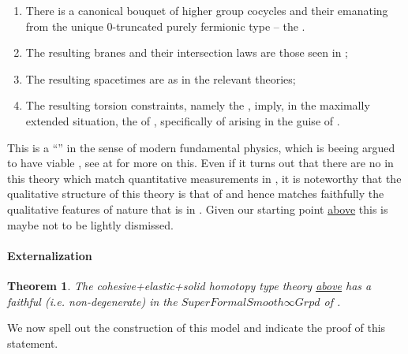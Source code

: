 \documentclass[12pt,titlepage]{article}
\theoremstyle{plain}
\newtheorem{theorem}{Theorem}
\theoremstyle{definition}
\theoremstyle{remark}
\begin{document}
\begin{enumerate}%
\item There is a canonical bouquet of higher group cocycles and their  emanating from the unique 0-truncated purely fermionic type -- the .


\item The resulting branes and their intersection laws are those seen in ;


\item The resulting spacetimes are  as in the relevant  theories;


\item The resulting torsion constraints, namely the , imply, in the maximally extended situation, the   of , specifically of  arising in the guise of .



\end{enumerate}
This is a ``'' in the sense of modern fundamental physics, which is beeing argued to have viable , see at \emph{} for more on this. Even if it turns out that there are no  in this theory which match quantitative measurements in , it is noteworthy that the qualitative structure of this theory is that of  and hence matches faithfully the qualitative features of nature that is in . Given our starting point \hyperlink{TheGround}{above} this is maybe not to be lightly dismissed.

\hypertarget{Externalization}{}\paragraph*{{Externalization}}\label{Externalization}

\begin{theorem}
\label{SupergeometryIsModel}\hypertarget{SupergeometryIsModel}{}
The cohesive+elastic+solid homotopy type theory \hyperlink{ObjectiveLogic}{above} has a faithful (i.e. non-degenerate)  in the  $SuperFormalSmooth\infty Grpd$ of \emph{}.

\end{theorem}
We now spell out the construction of this model and indicate the proof of this statement.
\end{document}
